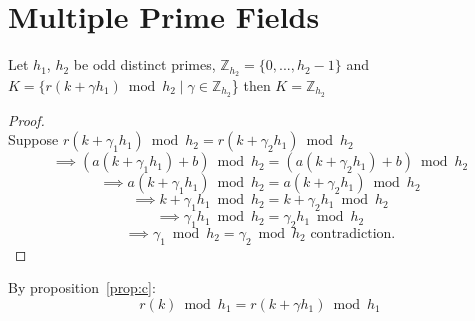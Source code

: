 \documentclass{article}
\begin{document}
\section{Multiple Prime Fields}\label{sec:3}
\textcolor{RawSienna}{
\begin{proposition}
Let $h_1$, $h_2$ be odd distinct primes,
$\mathbb{Z}_{h_2} = \{0,...,h_2-1\}$ and $ K = \{r(k+\gamma h_1) \bmod h_2 \mid \gamma \in \mathbb{Z}_{h_2}$\} then $K = \mathbb{Z}_{h_2}$
\end{proposition}
\begin{proof}
~\\
Suppose $r(k+\gamma_1 h_1) \bmod h_2 = r(k+\gamma_2 h_1) \bmod h_2$\\
$$ \implies (a(k+\gamma_1 h_1) + b) \bmod h_2 = (a(k+\gamma_2 h_1) + b) \bmod h_2$$
$$ \implies a(k+\gamma_1 h_1) \bmod h_2 = a(k+\gamma_2 h_1) \bmod h_2$$
$$ \implies k+\gamma_1 h_1 \bmod h_2 = k+\gamma_2 h_1 \bmod h_2$$
$$ \implies \gamma_1 h_1 \bmod h_2 = \gamma_2 h_1 \bmod h_2$$
$$\implies \gamma_1 \bmod h_2 = \gamma_2 \bmod h_2 \text{ contradiction.}$$
\end{proof}
By proposition~\ref{prop:c}:
$$r(k) \bmod h_1 = r(k+\gamma h_1) \bmod h_1$$
}
\end{document}
